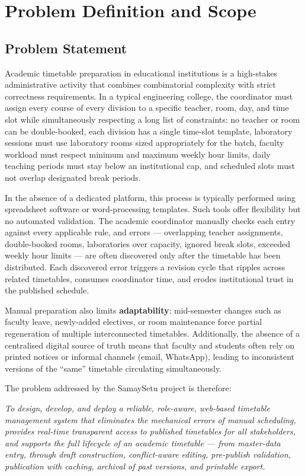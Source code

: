 \newpage
\chapter{Problem Definition and Scope}

\section{Problem Statement}

Academic timetable preparation in educational institutions is a high-stakes administrative activity that combines combinatorial complexity with strict correctness requirements. In a typical engineering college, the coordinator must assign every course of every division to a specific teacher, room, day, and time slot while simultaneously respecting a long list of constraints: no teacher or room can be double-booked, each division has a single time-slot template, laboratory sessions must use laboratory rooms sized appropriately for the batch, faculty workload must respect minimum and maximum weekly hour limits, daily teaching periods must stay below an institutional cap, and scheduled slots must not overlap designated break periods.

In the absence of a dedicated platform, this process is typically performed using spreadsheet software or word-processing templates. Such tools offer flexibility but no automated validation. The academic coordinator manually checks each entry against every applicable rule, and errors --- overlapping teacher assignments, double-booked rooms, laboratories over capacity, ignored break slots, exceeded weekly hour limits --- are often discovered only after the timetable has been distributed. Each discovered error triggers a revision cycle that ripples across related timetables, consumes coordinator time, and erodes institutional trust in the published schedule.

Manual preparation also limits \textbf{adaptability}: mid-semester changes such as faculty leave, newly-added electives, or room maintenance force partial regeneration of multiple interconnected timetables. Additionally, the absence of a centralised digital source of truth means that faculty and students often rely on printed notices or informal channels (email, WhatsApp), leading to inconsistent versions of the ``same'' timetable circulating simultaneously.

The problem addressed by the SamaySetu project is therefore:

\textit{To design, develop, and deploy a reliable, role-aware, web-based timetable management system that eliminates the mechanical errors of manual scheduling, provides real-time transparent access to published timetables for all stakeholders, and supports the full lifecycle of an academic timetable --- from master-data entry, through draft construction, conflict-aware editing, pre-publish validation, publication with caching, archival of past versions, and printable export.}

